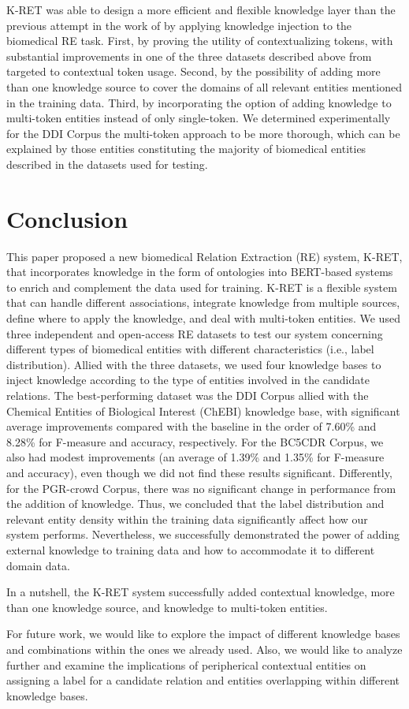 K-RET was able to design a more efficient and flexible knowledge layer than the previous attempt in the work of \cite{liu2020k} by applying knowledge injection to the biomedical RE task. First, by proving the utility of contextualizing tokens, with substantial improvements in one of the three datasets described above from targeted to contextual token usage. Second, by the possibility of adding more than one knowledge source to cover the domains of all relevant entities mentioned in the training data. Third, by incorporating the option of adding knowledge to multi-token entities instead of only single-token. We determined experimentally for the DDI Corpus the multi-token approach to be more thorough, which can be explained by those entities constituting the majority of biomedical entities described in the datasets used for testing.

\section{Conclusion}

This paper proposed a new biomedical Relation Extraction (RE) system, K-RET, that incorporates knowledge in the form of ontologies into BERT-based systems to enrich and complement the data used for training. K-RET is a flexible system that can handle different associations, integrate knowledge from multiple sources, define where to apply the knowledge, and deal with multi-token entities. We used three independent and open-access RE datasets to test our system concerning different types of biomedical entities with different characteristics (i.e., label distribution). Allied with the three datasets, we used four knowledge bases to inject knowledge according to the type of entities involved in the candidate relations. The best-performing dataset was the DDI Corpus allied with the Chemical Entities of Biological Interest (ChEBI) knowledge base, with significant average improvements compared with the baseline in the order of 7.60\% and 8.28\% for F-measure and accuracy, respectively. For the BC5CDR Corpus, we also had modest improvements (an average of 1.39\% and 1.35\% for F-measure and accuracy), even though we did not find these results significant. Differently, for the PGR-crowd Corpus, there was no significant change in performance from the addition of knowledge. Thus, we concluded that the label distribution and relevant entity density within the training data significantly affect how our system performs. Nevertheless, we successfully demonstrated the power of adding external knowledge to training data and how to accommodate it to different domain data. 

In a nutshell, the K-RET system successfully added contextual knowledge, more than one knowledge source, and knowledge to multi-token entities. 

For future work, we would like to explore the impact of different knowledge bases and combinations within the ones we already used. Also, we would like to analyze further and examine the implications of peripherical contextual entities on assigning a label for a candidate relation and entities overlapping within different knowledge bases. 
